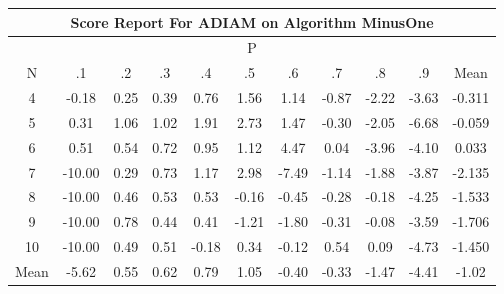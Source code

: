 \documentclass[11pt,a4paper]{report}
\begin{document}
\begin{longtable}{ | c || c | c | c | c | c | c | c | c | c || c |}
\hline
\multicolumn{11}{|c|}{ Score Report For ADIAM on Algorithm MinusOne} \\
\hline
\multicolumn{11}{|c|}{ P } \\
\hline
N & .1 & .2 & .3 & .4 & .5 & .6 & .7 & .8 & .9 & Mean\\
 \hline
 \hline
 \endhead
  4 &  \cellcolor[HTML]{FFF7F7} -0.18 &  \cellcolor[HTML]{F7F7FF} 0.25 &  \cellcolor[HTML]{F7F7FF} 0.39 &  \cellcolor[HTML]{EFEFFF} 0.76 &  \cellcolor[HTML]{D7D7FF} 1.56 &  \cellcolor[HTML]{DFDFFF} 1.14 &  \cellcolor[HTML]{FFE7E7} -0.87 &  \cellcolor[HTML]{FFC7C7} -2.22 &  \cellcolor[HTML]{FFA7A7} -3.63 & -0.311 \\
  5 &  \cellcolor[HTML]{F7F7FF} 0.31 &  \cellcolor[HTML]{E7E7FF} 1.06 &  \cellcolor[HTML]{E7E7FF} 1.02 &  \cellcolor[HTML]{CFCFFF} 1.91 &  \cellcolor[HTML]{B7B7FF} 2.73 &  \cellcolor[HTML]{D7D7FF} 1.47 &  \cellcolor[HTML]{FFF7F7} -0.30 &  \cellcolor[HTML]{FFCFCF} -2.05 &  \cellcolor[HTML]{FF5858} -6.68 & -0.059 \\
  6 &  \cellcolor[HTML]{EFEFFF} 0.51 &  \cellcolor[HTML]{EFEFFF} 0.54 &  \cellcolor[HTML]{EFEFFF} 0.72 &  \cellcolor[HTML]{E7E7FF} 0.95 &  \cellcolor[HTML]{DFDFFF} 1.12 &  \cellcolor[HTML]{8F8FFF} 4.47 &  \cellcolor[HTML]{FFFFFF} 0.04 &  \cellcolor[HTML]{FF9F9F} -3.96 &  \cellcolor[HTML]{FF9797} -4.10 & 0.033 \\
  7 &  \cellcolor[HTML]{FF0000} -10.00 &  \cellcolor[HTML]{F7F7FF} 0.29 &  \cellcolor[HTML]{EFEFFF} 0.73 &  \cellcolor[HTML]{DFDFFF} 1.17 &  \cellcolor[HTML]{B7B7FF} 2.98 &  \cellcolor[HTML]{FF4040} -7.49 &  \cellcolor[HTML]{FFDFDF} -1.14 &  \cellcolor[HTML]{FFCFCF} -1.88 &  \cellcolor[HTML]{FF9F9F} -3.87 & -2.135 \\
  8 &  \cellcolor[HTML]{FF0000} -10.00 &  \cellcolor[HTML]{F7F7FF} 0.46 &  \cellcolor[HTML]{EFEFFF} 0.53 &  \cellcolor[HTML]{EFEFFF} 0.53 &  \cellcolor[HTML]{FFFFFF} -0.16 &  \cellcolor[HTML]{FFF7F7} -0.45 &  \cellcolor[HTML]{FFF7F7} -0.28 &  \cellcolor[HTML]{FFF7F7} -0.18 &  \cellcolor[HTML]{FF9797} -4.25 & -1.533 \\
  9 &  \cellcolor[HTML]{FF0000} -10.00 &  \cellcolor[HTML]{EFEFFF} 0.78 &  \cellcolor[HTML]{F7F7FF} 0.44 &  \cellcolor[HTML]{F7F7FF} 0.41 &  \cellcolor[HTML]{FFDFDF} -1.21 &  \cellcolor[HTML]{FFCFCF} -1.80 &  \cellcolor[HTML]{FFF7F7} -0.31 &  \cellcolor[HTML]{FFFFFF} -0.08 &  \cellcolor[HTML]{FFA7A7} -3.59 & -1.706 \\
  10 &  \cellcolor[HTML]{FF0000} -10.00 &  \cellcolor[HTML]{EFEFFF} 0.49 &  \cellcolor[HTML]{EFEFFF} 0.51 &  \cellcolor[HTML]{FFF7F7} -0.18 &  \cellcolor[HTML]{F7F7FF} 0.34 &  \cellcolor[HTML]{FFFFFF} -0.12 &  \cellcolor[HTML]{EFEFFF} 0.54 &  \cellcolor[HTML]{FFFFFF} 0.09 &  \cellcolor[HTML]{FF8787} -4.73 & -1.450 \\
 \hline
 \hline
Mean &  \cellcolor[HTML]{FF7070} -5.62 &  \cellcolor[HTML]{EFEFFF} 0.55 &  \cellcolor[HTML]{EFEFFF} 0.62 &  \cellcolor[HTML]{EFEFFF} 0.79 &  \cellcolor[HTML]{E7E7FF} 1.05 &  \cellcolor[HTML]{FFF7F7} -0.40 &  \cellcolor[HTML]{FFF7F7} -0.33 &  \cellcolor[HTML]{FFD7D7} -1.47 &  \cellcolor[HTML]{FF8F8F} -4.41 &  \cellcolor[HTML]{FFE7E7} -1.02
\end{longtable}
\end{document}
